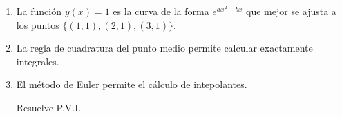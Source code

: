 \documentclass[11pt]{article}
\begin{document}
\begin{enumerate}
\begin{enumerate}
\begin{minipage}{0.4\textwidth}
    \end{minipage}
%
\item
{} 
    \begin{minipage}{0.4\textwidth}
	La funci\'on $y(x)=1$ es la curva de la forma $e^{ax^2+bx}$ que mejor se ajusta a los puntos $\{(1,1),(2,1),(3,1)\}$.
    \end{minipage} 
    \begin{minipage}{0.4\textwidth}
    \end{minipage}
\item
{} 
    \begin{minipage}{0.4\textwidth}
   	La regla de cuadratura del punto medio permite calcular exactamente integrales.
    \end{minipage} 
    \begin{minipage}{0.4\textwidth}
    

    \end{minipage}
%
\item
{} 
    \begin{minipage}{0.4\textwidth}
    El método de Euler permite el cálculo de intepolantes.
    \end{minipage} 
    \begin{minipage}{0.4\textwidth}
  Resuelve P.V.I. 
  
    \end{minipage}
\end{enumerate}


\end{enumerate}
\end{document}
